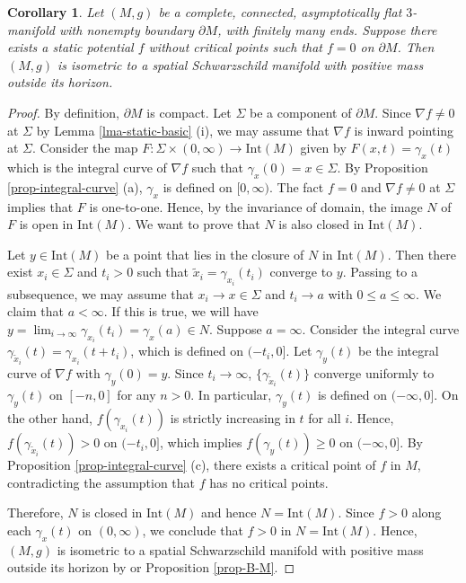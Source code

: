 \documentclass[12pt]{amsart}
\newtheorem{cor}{Corollary}[section]
\theoremstyle{remark}
\numberwithin{equation}{section}
\def\p{\partial}
\def\Int{\text{Int}}
\begin{document}
\begin{cor} \label{cor-BM-no-critical-pts}
Let $(M,g)$ be a complete, connected, asymptotically flat $3$-manifold with nonempty   boundary $\p M$, with finitely many ends.
Suppose there exists a static potential $ f$ without critical points such that  $f=0$ on $\p M$.
 Then
  $(M, g)$ is isometric to a spatial Schwarzschild manifold with positive mass outside its horizon.
\end{cor}
\begin{proof}
By definition, $\p M$ is compact.  Let $\Sigma$ be a component of $\p M$.
 Since $\nabla f \neq 0 $ at $\Sigma$ by  Lemma \ref{lma-static-basic} (i),
 we may assume that
  $\nabla f$ is inward pointing at $\Sigma$. Consider the map
$F:\Sigma\times(0,\infty) \rightarrow \Int (M)  $ given by $F(x,t)=\gamma_x(t)$ which is the integral curve of $\nabla f$
such that $\gamma_x(0)=x\in \Sigma$. By  Proposition \ref{prop-integral-curve} (a), $\gamma_x$ is defined on $[0,\infty)$.
The fact $f=0$ and $ \nabla f \neq 0 $ at  $\Sigma $ implies that  $F$  is one-to-one.
Hence, by the invariance of  domain, the image $N$ of $F$ is open in $\Int(M)$. We want to prove that $N$ is also closed in $\Int(M)$.

Let $y \in \Int (M) $ be a point that lies in the closure  of $N$ in  $\Int(M)$.
Then there exist $x_i\in \Sigma$ and $t_i > 0$ such that $\tilde x_i=\gamma_{x_i}(t_i)$ converge to $y$.
Passing to a subsequence, we may assume that $x_i\to x\in \Sigma$ and $t_i\to a$  with $0\le a\le\infty$.
We claim that $a<\infty$.
If this is true, we will have  $y = \lim_{ i \rightarrow \infty} \gamma_{x_i} (t_i)  = \gamma_x (a) \in N$.
Suppose $a=\infty$.  Consider the integral curve $\gamma_{\tilde x_i}(t)=\gamma_{x_i}(t+t_i)$, which is defined on $(-t_i, 0] $. Let $\gamma_y(t)$ be the integral curve of $\nabla f$ with $\gamma_y(0)=y$.
Since $ t_i \rightarrow \infty$,  $ \{ \gamma_{\tilde x_i}(t) \} $ converge uniformly to $\gamma_{y}(t)$ on $[- n ,0]$ for any  $n>0$.
In particular, $\gamma_y(t)$ is defined on $(-\infty,0]$.
On the other hand, $f(\gamma_{x_i}(t))$ is strictly increasing in $t$ for all $i$. Hence, $f(\gamma_{\tilde x_i}(t))>0$ on $(-t_i,0]$,
which implies $f(\gamma_y(t))\ge 0$ on $(-\infty,0]$.   By Proposition \ref{prop-integral-curve} (c),
there exists  a critical point of $f$ in $M$, contradicting the assumption that $f$ has no critical points.

Therefore, $N$ is  closed in $\Int(M)$ and hence $N=\Int(M)$. Since $f > 0 $ along each  $\gamma_x (t) $ on $(0 , \infty)$,
we conclude that  $f>0$ in $N=\Int(M)$. Hence,  $(M, g)$ is isometric to a spatial Schwarzschild manifold with positive mass outside its horizon
 by \cite{Bunting-Masood} or Proposition \ref{prop-B-M}.
\end{proof}
\end{document}
